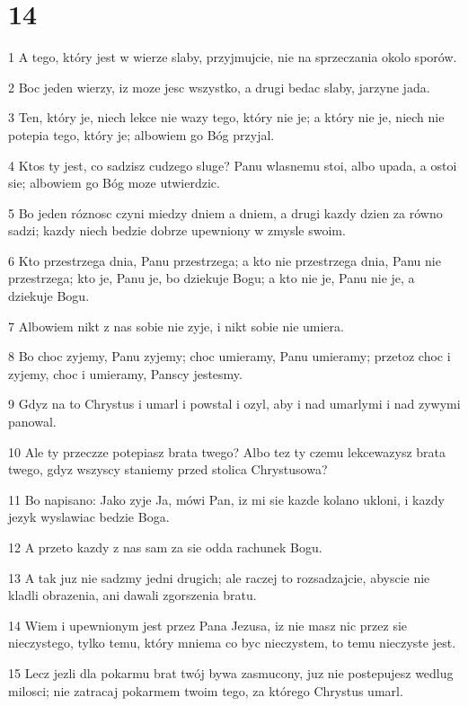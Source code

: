 \chapter{14}

\par 1 A tego, który jest w wierze slaby, przyjmujcie, nie na sprzeczania okolo sporów.
\par 2 Boc jeden wierzy, iz moze jesc wszystko, a drugi bedac slaby, jarzyne jada.
\par 3 Ten, który je, niech lekce nie wazy tego, który nie je; a który nie je, niech nie potepia tego, który je; albowiem go Bóg przyjal.
\par 4 Ktos ty jest, co sadzisz cudzego sluge? Panu wlasnemu stoi, albo upada, a ostoi sie; albowiem go Bóg moze utwierdzic.
\par 5 Bo jeden róznosc czyni miedzy dniem a dniem, a drugi kazdy dzien za równo sadzi; kazdy niech bedzie dobrze upewniony w zmysle swoim.
\par 6 Kto przestrzega dnia, Panu przestrzega; a kto nie przestrzega dnia, Panu nie przestrzega; kto je, Panu je, bo dziekuje Bogu; a kto nie je, Panu nie je, a dziekuje Bogu.
\par 7 Albowiem nikt z nas sobie nie zyje, i nikt sobie nie umiera.
\par 8 Bo choc zyjemy, Panu zyjemy; choc umieramy, Panu umieramy; przetoz choc i zyjemy, choc i umieramy, Panscy jestesmy.
\par 9 Gdyz na to Chrystus i umarl i powstal i ozyl, aby i nad umarlymi i nad zywymi panowal.
\par 10 Ale ty przeczze potepiasz brata twego? Albo tez ty czemu lekcewazysz brata twego, gdyz wszyscy staniemy przed stolica Chrystusowa?
\par 11 Bo napisano: Jako zyje Ja, mówi Pan, iz mi sie kazde kolano ukloni, i kazdy jezyk wyslawiac bedzie Boga.
\par 12 A przeto kazdy z nas sam za sie odda rachunek Bogu.
\par 13 A tak juz nie sadzmy jedni drugich; ale raczej to rozsadzajcie, abyscie nie kladli obrazenia, ani dawali zgorszenia bratu.
\par 14 Wiem i upewnionym jest przez Pana Jezusa, iz nie masz nic przez sie nieczystego, tylko temu, który mniema co byc nieczystem, to temu nieczyste jest.
\par 15 Lecz jezli dla pokarmu brat twój bywa zasmucony, juz nie postepujesz wedlug milosci; nie zatracaj pokarmem twoim tego, za którego Chrystus umarl.
